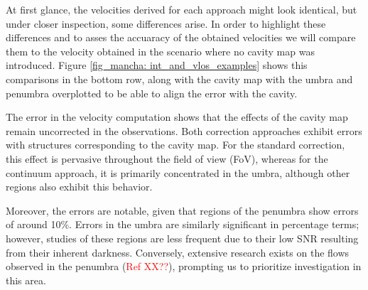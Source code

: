 At first glance, the velocities derived for each approach might look identical, but under closer inspection, some differences arise. In order to highlight these differences and to asses the accuaracy of the obtained velocities we will compare them to the velocity obtained in the scenario where no cavity map was introduced. Figure \ref{fig_mancha: int_and_vlos_examples} shows this comparisons in the bottom row, along with the cavity map with the umbra and penumbra overplotted to be able to align the error with the cavity.   

The error in the velocity computation shows that the effects of the cavity map remain uncorrected in the observations. Both correction approaches exhibit errors with structures corresponding to the cavity map. For the standard correction, this effect is pervasive throughout the field of view (FoV), whereas for the continuum approach, it is primarily concentrated in the umbra, although other regions also exhibit this behavior.

Moreover, the errors are notable, given that regions of the penumbra show errors of around 10\%. Errors in the umbra are similarly significant in percentage terms; however, studies of these regions are less frequent due to their low SNR resulting from their inherent darkness. Conversely, extensive research exists on the flows observed in the penumbra (\textcolor{red}{Ref XX??}), prompting us to prioritize investigation in this area.

